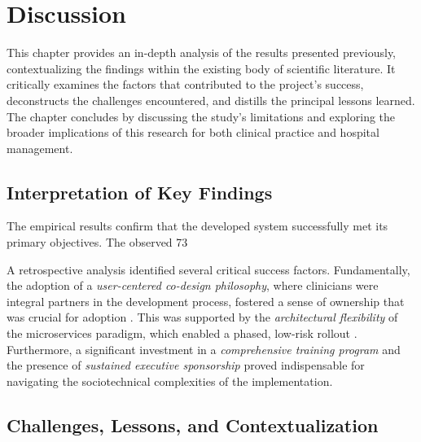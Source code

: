\chapter{Discussion}

This chapter provides an in-depth analysis of the results presented previously, contextualizing the findings within the existing body of scientific literature. It critically examines the factors that contributed to the project's success, deconstructs the challenges encountered, and distills the principal lessons learned. The chapter concludes by discussing the study's limitations and exploring the broader implications of this research for both clinical practice and hospital management.

\section{Interpretation of Key Findings}

The empirical results confirm that the developed system successfully met its primary objectives. The observed 73%

A retrospective analysis identified several critical success factors. Fundamentally, the adoption of a \textit{user-centered co-design philosophy}, where clinicians were integral partners in the development process, fostered a sense of ownership that was crucial for adoption \cite{venkatesh2003}. This was supported by the \textit{architectural flexibility} of the microservices paradigm, which enabled a phased, low-risk rollout \cite{newman2021}. Furthermore, a significant investment in a \textit{comprehensive training program} and the presence of \textit{sustained executive sponsorship} proved indispensable for navigating the sociotechnical complexities of the implementation.

\section{Challenges, Lessons, and Contextualization}

